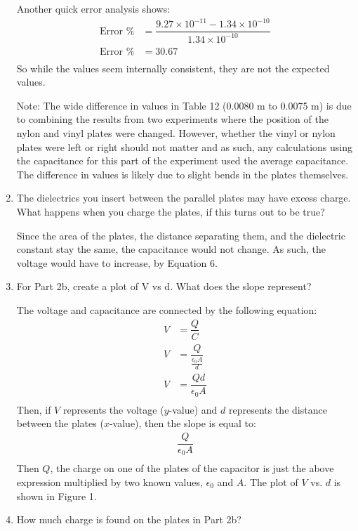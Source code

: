 \documentclass [12pt, letterpaper, twoside] {article}
\begin{document}
\begin{enumerate}
  Another quick error analysis shows:
  \begin{equation*}
    \begin{split}
      \text{Error \%} &= \dfrac{9.27\times10^{-11} - 1.34\times10^{-10}}{1.34\times10^{-10}} \\ %
      \text{Error \%} &= 30.67 \\ %
    \end{split}
  \end{equation*}
  So while the values seem internally consistent, they are not the expected values.

  Note: The wide difference in values in Table 12 (0.0080 m to 0.0075 m) is due to combining the results from two experiments where the position of the nylon and vinyl plates were changed. However, whether the vinyl or nylon plates were left or right should not matter and as such, any calculations using the capacitance for this part of the experiment used the average capacitance. The difference in values is likely due to slight bends in the plates themselves.
  \item The dielectrics you insert between the parallel plates may have excess charge.  What happens when you charge the plates, if this turns out to be true?

  Since the area of the plates, the distance separating them, and the dielectric constant stay the same, the capacitance would not change. As such, the voltage would have to increase, by Equation 6.
  \item For Part 2b, create a plot of V vs d.  What does the slope represent?

  The voltage and capacitance are connected by the following equation:
  \begin{equation}
    \begin{split}
      V &= \dfrac{Q}{C} \\
      V &= \dfrac{Q}{\tfrac{\epsilon_{0}A}{d}} \\
      V &= \dfrac{Qd}{\epsilon_{0}A} \\
    \end{split}
  \end{equation}
  Then, if \(V\) represents the voltage (\(y\)-value) and \(d\) represents the distance between the plates (\(x\)-value), then the slope is equal to:
  \begin{equation*}
    \begin{split}
      \dfrac{Q}{\epsilon_{0}A} \\
    \end{split}
  \end{equation*}
  Then \(Q\), the charge on one of the plates of the capacitor is just the above expression multiplied by two known values, \(\epsilon_{0}\) and \(A\). The plot of \(V\) vs. \(d\) is shown in Figure 1.
  \item How much charge is found on the plates in Part 2b?


\end{enumerate}
\end{document}

